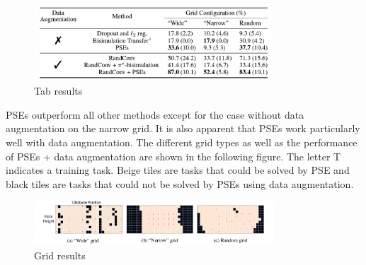 \documentclass{usiinftr}
\begin{document}
\begin{figure} 
\centering
\includegraphics[width = 0.8\textwidth]{figures/tabular_results.png}
\caption{\label{fig: tabular_results}Tab results}
\end{figure}

PSEs outperform all other methods except for the case without data augmentation on the narrow grid. It is also apparent that PSEs work particularly well with data augmentation.
The different grid types as well as the performance of PSEs + data augmentation are shown in the following figure. The letter T indicates a training task. Beige tiles are tasks that could be solved by PSE and black tiles are tasks that could not be solved by PSEs using data augmentation.

\begin{figure} 
\centering
\includegraphics[width = 0.8\textwidth]{figures/grid_results.png}
\caption{\label{fig: grid_results}Grid results}
\end{figure}



\end{document}
